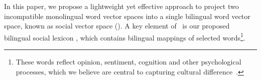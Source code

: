 In this paper, we propose a lightweight yet effective approach to project 
two incompatible monolingual word vector spaces into 
a single bilingual word vector space, known as 
social vector space (\textit{\socvec}).
A key element of \socvec\ is our proposed bilingual social lexicon , which 
contains bilingual mappings of selected words\footnote{These words reflect opinion, sentiment, cognition and other psychological 
	processes, which we believe are central to capturing cultural difference~\cite{Garimella2016IdentifyingCD}. }.

